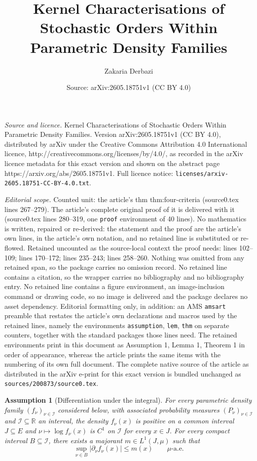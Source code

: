 \documentclass[10pt,a4paper]{amsart}
\title{Kernel Characterisations of Stochastic Orders Within Parametric Density Families}
\author{Zakaria Derbazi}
\date{Source: arXiv:2605.18751v1 (CC BY 4.0)}
\newtheorem{assumption}{Assumption}
\newcommand{\R}{\mathbb{R}}
\begin{document}
\maketitle

\noindent\emph{Source and licence.} Kernel Characterisations of Stochastic Orders Within Parametric Density Families. Version arXiv:2605.18751v1 (CC BY 4.0), distributed by arXiv under the Creative Commons Attribution 4.0 International licence, http://creativecommons.org/licenses/by/4.0/, as recorded in the arXiv licence metadata for this exact version and shown on the abstract page https://arxiv.org/abs/2605.18751v1. Full licence notice: \texttt{licenses/arxiv-2605.18751-CC-BY-4.0.txt}.\par\smallskip

\noindent\textit{Editorial scope.} Counted unit: the article's thm thm:four-criteria (source0.tex lines 267--279). The article's complete original proof of it is delivered with it (source0.tex lines 280--319, one \texttt{proof} environment of 40 lines). No mathematics is written, repaired or re-derived: the statement and the proof are the article's own lines, in the article's own notation, and no retained line is substituted or re-flowed.  Retained uncounted as the source-local context the proof needs: lines 102--109; lines 170--172; lines 235--243; lines 258--260.  Nothing was omitted from any retained span, so the package carries no omission record.  No retained line contains a citation, so the wrapper carries no bibliography and no bibliography entry.  No retained line contains a figure environment, an image-inclusion command or drawing code, so no image is delivered and the package declares no asset dependency.  Editorial formatting only, in addition: an AMS \texttt{amsart} preamble that restates the article's own declarations and macros used by the retained lines, namely the environments \texttt{assumption}, \texttt{lem}, \texttt{thm} on separate counters, together with the standard packages those lines need.  The retained environments print in this document as Assumption 1, Lemma 1, Theorem 1 in order of appearance, whereas the article prints the same items with the numbering of its own full document.  The complete native source of the article as distributed in the arXiv e-print for this exact version is bundled unchanged as \texttt{sources/200873/source0.tex}.
\begin{assumption}[Differentiation under the integral]
\label{asm:diff-under-integral}
For every parametric density family \((f_\nu)_{\nu\in\mathcal I}\) considered below, with associated probability measures \((P_\nu)_{\nu\in\mathcal I}\) and \(\mathcal I\subseteq\R\) an interval, the density \(f_\nu(x)\) is positive on a common interval \(J\subseteq E\) and \(\nu \mapsto\log f_\nu(x)\) is \(C^1\) on \(\mathcal I\) for every \(x\in J\). For every compact interval \(B\subseteq\mathcal I\), there exists a majorant \(m\in L^1(J,\mu)\) such that
\[
\sup_{\nu\in B}\bigl|\partial_\nu f_\nu(x)\bigr|\le m(x)
\qquad \mu\text{-a.e.}
\]
\end{assumption}
\end{document}
